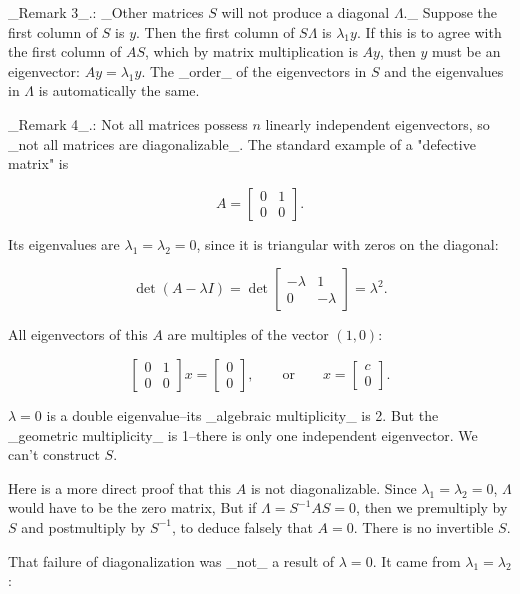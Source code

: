 _Remark 3_.: _Other matrices \(S\) will not produce a diagonal \(\Lambda\)._ Suppose the first column of \(S\) is \(y\). Then the first column of \(S\Lambda\) is \(\lambda_{1}y\). If this is to agree with the first column of \(AS\), which by matrix multiplication is \(Ay\), then \(y\) must be an eigenvector: \(Ay=\lambda_{1}y\). The _order_ of the eigenvectors in \(S\) and the eigenvalues in \(\Lambda\) is automatically the same.

_Remark 4_.: Not all matrices possess \(n\) linearly independent eigenvectors, so _not all matrices are diagonalizable_. The standard example of a "defective matrix" is

\[A=\begin{bmatrix}0&1\\ 0&0\end{bmatrix}.\]

Its eigenvalues are \(\lambda_{1}=\lambda_{2}=0\), since it is triangular with zeros on the diagonal:

\[\det(A-\lambda I)=\det\begin{bmatrix}-\lambda&1\\ 0&-\lambda\end{bmatrix}=\lambda^{2}.\]

All eigenvectors of this \(A\) are multiples of the vector \((1,0)\):

\[\begin{bmatrix}0&1\\ 0&0\end{bmatrix}x=\begin{bmatrix}0\\ 0\end{bmatrix},\qquad\text{or}\qquad x=\begin{bmatrix}c\\ 0\end{bmatrix}.\]

\(\lambda=0\) is a double eigenvalue--its _algebraic multiplicity_ is 2. But the _geometric multiplicity_ is 1--there is only one independent eigenvector. We can't construct \(S\).

Here is a more direct proof that this \(A\) is not diagonalizable. Since \(\lambda_{1}=\lambda_{2}=0\), \(\Lambda\) would have to be the zero matrix, But if \(\Lambda=S^{-1}AS=0\), then we premultiply by \(S\) and postmultiply by \(S^{-1}\), to deduce falsely that \(A=0\). There is no invertible \(S\).

That failure of diagonalization was _not_ a result of \(\lambda=0\). It came from \(\lambda_{1}=\lambda_{2}\):

